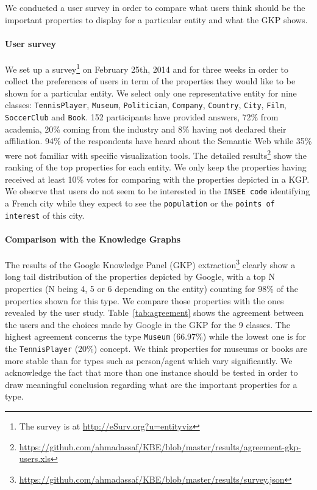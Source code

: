 We conducted a user survey in order to compare what users think should be the important properties to display for a particular entity and what the GKP shows.

\paragraph{\textbf{User survey\\}}

We set up a survey\footnote{The survey is at \url{http://eSurv.org?u=entityviz}} on February 25th, 2014 and for three weeks in order to collect the preferences of users in term of the properties they would like to be shown for a particular entity. We select only one representative entity for nine classes: \texttt{TennisPlayer}, \texttt{Museum}, \texttt{Politician}, \texttt{Company}, \texttt{Country}, \texttt{City}, \texttt{Film}, \texttt{SoccerClub} and \texttt{Book}. 152 participants have provided answers, 72\% from academia, 20\% coming from the industry and 8\% having not declared their affiliation. 94\% of the respondents have heard about the Semantic Web while 35\% were not familiar with specific visualization tools. The detailed results\footnote{\url{https://github.com/ahmadassaf/KBE/blob/master/results/agreement-gkp-users.xls}} show the ranking of the top properties for each entity. We only keep the properties having received at least 10\% votes for comparing with the properties depicted in a KGP. We observe that users do not seem to be interested in the \texttt{INSEE code} identifying a French city while they expect to see the \texttt{population} or the \texttt{points of interest} of this city.

\paragraph{\textbf{Comparison with the Knowledge Graphs\\}}

The results of the Google Knowledge Panel (GKP) extraction\footnote{\url{https://github.com/ahmadassaf/KBE/blob/master/results/survey.json}} clearly show a long tail distribution of the properties depicted by Google, with a top N properties (N being 4, 5 or 6 depending on the entity) counting for 98\% of the properties shown for this type. We compare those properties with the ones revealed by the user study. Table~\ref{tab:agreement} shows the agreement between the users and the choices made by Google in the GKP for the 9 classes. The highest agreement concerns the type \texttt{Museum} (66.97\%) while the lowest one is for the \texttt{TennisPlayer} (20\%) concept. We think properties for museums or books are more stable than for types such as person/agent which vary significantly. We acknowledge the fact that more than one instance should be tested in order to draw meaningful conclusion regarding what are the important properties for a type.

